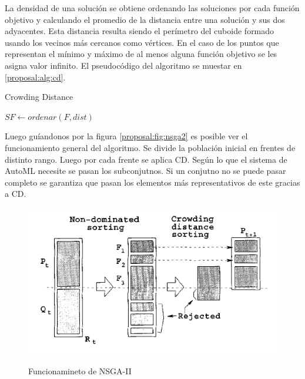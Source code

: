 La densidad de una soluci\'on se obtiene ordenando las soluciones por cada funci\'on objetivo y calculando el promedio de la distancia entre una soluci\'on y sus dos adyacentes. Esta distancia resulta siendo el per\'imetro del cuboide formado usando los vecinos m\'as cercanos como v\'ertices. En el caso de los puntos que representan el m\'inimo y m\'aximo de al menos alguna funci\'on objetivo se les asigna valor infinito. El pseudoc\'odigo del algoritmo se muestar en \ref{proposal:alg:cd}.

\begin{algorithm*}[H]\caption{Crowding Distance}\label{proposal:alg:cd}

    $SF \gets ordenar(F, dist)$ 

\end{algorithm*}

Luego gu\'iandonos por la figura \ref{proposal:fig:nsga2} es posible ver el funcionamiento general del algoritmo. Se divide la poblaci\'on inicial en frentes de distinto rango. Luego por cada frente se aplica CD. Seg\'un lo que el sistema de AutoML necesite se pasan los subconjutnos. Si un conjutno no se puede pasar completo se garantiza que pasan los elementos m\'as representativos de este gracias a CD.

\begin{figure}\caption{Funcionamineto de NSGA-II}\label{proposal:fig:nsga2}
    \includegraphics[width=\linewidth]{Pictures/nsga2.png}
    \label{nsga2}
\end{figure}

